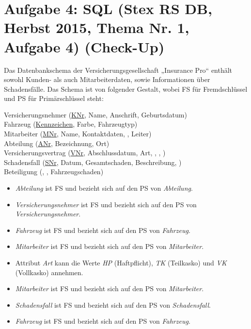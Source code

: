 
\section{Aufgabe 4: SQL (Stex RS DB, Herbst 2015, Thema Nr. 1, Aufgabe 4) (Check-Up)}

Das Datenbankschema der Versicherungsgesellschaft „Insurance Pro“
enthält sowohl Kunden- als auch Mitarbeiterdaten, sowie Informationen
über Schadensfälle. Das Schema ist von folgender Gestalt, wobei FS für
Fremdschlüssel und PS für Primärschlüssel steht:

\bigskip

{
\ttfamily
\noindent
Versicherungsnehmer (\underline{KNr}, Name, Anschrift, Geburtsdatum)\\

\noindent
Fahrzeug (\underline{Kennzeichen}, Farbe, Fahrzeugtyp)\\

\noindent
Mitarbeiter (\underline{MNr}, Name, Kontaktdaten, ,
Leiter)\\

\noindent
Abteilung (\underline{ANr}, Bezeichnung, Ort)\\

\noindent
Versicherungsvertrag (\underline{VNr}, Abschlussdatum, Art,
, ,
)\\

\noindent
Schadensfall (\underline{SNr}, Datum, Gesamtschaden, Beschreibung,
)\\

\noindent
Beteiligung (, ,
Fahrzeugschaden)}

\bigskip

\begin{itemize}
\item \emph{Abteilung} ist FS und bezieht sich auf den PS von
\emph{Abteilung}.

\item \emph{Versicherungsnehmer} ist FS und bezieht sich auf den PS von
\emph{Versicherungsnehmer}.

\item \emph{Fahrzeug} ist FS und bezieht sich auf den PS von
\emph{Fahrzeug}.

\item \emph{Mitarbeiter} ist FS und bezieht sich auf den PS von
\emph{Mitarbeiter}.

\item Attribut \emph{Art} kann die Werte \emph{HP} (Haftpflicht),
\emph{TK} (Teilkasko) und \emph{VK} (Vollkasko) annehmen.

\item \emph{Mitarbeiter} ist FS und bezieht sich auf den PS von
\emph{Mitarbeiter}.

\item \emph{Schadensfall} ist FS und bezieht sich auf den PS von
\emph{Schadensfall}.

\item \emph{Fahrzeug} ist FS und bezieht sich auf den PS von
\emph{Fahrzeug}.
\end{itemize}

